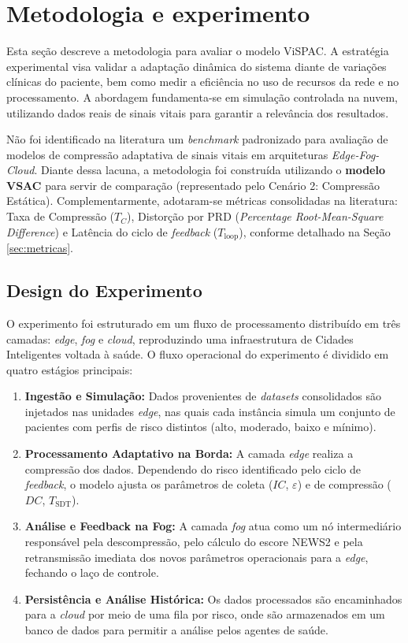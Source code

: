 \documentclass[twoside,english,brazilian]{UNISINOSmonografia}
\begin{document}
\chapter{Metodologia e experimento}

Esta seção descreve a metodologia para avaliar o modelo ViSPAC. A estratégia experimental visa validar a adaptação dinâmica do sistema diante de variações clínicas do paciente, bem como medir a eficiência no uso de recursos da rede e no processamento. A abordagem fundamenta-se em simulação controlada na nuvem, utilizando dados reais de sinais vitais para garantir a relevância dos resultados.

Não foi identificado na literatura um \textit{benchmark} padronizado para avaliação de modelos de compressão adaptativa de sinais vitais em arquiteturas \textit{Edge-Fog-Cloud}. Diante dessa lacuna, a metodologia foi construída utilizando o \textbf{modelo VSAC} \cite{Andrade2025} para servir de comparação (representado pelo Cenário 2: Compressão Estática). Complementarmente, adotaram-se métricas consolidadas na literatura: Taxa de Compressão ($T_C$), Distorção por PRD (\textit{Percentage Root-Mean-Square Difference}) e Latência do ciclo de \textit{feedback} ($T_{\text{loop}}$), conforme detalhado na Seção \ref{sec:metricas}.

\section{Design do Experimento}

O experimento foi estruturado em um fluxo de processamento distribuído em três camadas: \textit{edge}, \textit{fog} e \textit{cloud}, reproduzindo uma infraestrutura de Cidades Inteligentes voltada à saúde. O fluxo operacional do experimento é dividido em quatro estágios principais:

\begin{enumerate}
    \item \textbf{Ingestão e Simulação:} Dados provenientes de \textit{datasets} consolidados são injetados nas unidades \textit{edge}, nas quais cada instância simula um conjunto de pacientes com perfis de risco distintos (alto, moderado, baixo e mínimo).
    \item \textbf{Processamento Adaptativo na Borda:} A camada \textit{edge} realiza a compressão dos dados. Dependendo do risco identificado pelo ciclo de \textit{feedback}, o modelo ajusta os parâmetros de coleta ($IC$, $\varepsilon$) e de compressão ($DC$, $T_{\text{SDT}}$).
    \item \textbf{Análise e Feedback na Fog:} A camada \textit{fog} atua como um nó intermediário responsável pela descompressão, pelo cálculo do escore NEWS2 e pela retransmissão imediata dos novos parâmetros operacionais para a \textit{edge}, fechando o laço de controle.
    \item \textbf{Persistência e Análise Histórica:} Os dados processados são encaminhados para a \textit{cloud} por meio de uma fila por risco, onde são armazenados em um banco de dados para permitir a análise pelos agentes de saúde.
\end{enumerate}
\end{document}
